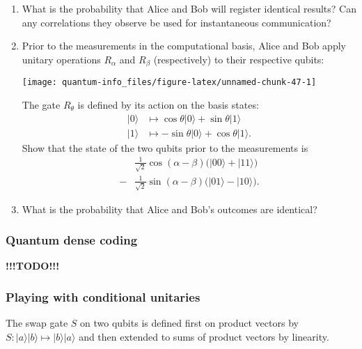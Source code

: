 \documentclass[fleqn]{article}
\begin{document}
\begin{enumerate}
\def\labelenumi{\arabic{enumi}.}
\item
  What is the probability that Alice and Bob will register identical results?
  Can any correlations they observe be used for instantaneous communication?
\item
  Prior to the measurements in the computational basis, Alice and Bob apply unitary operations \(R_\alpha\) and \(R_\beta\) (respectively) to their respective qubits:

  \begin{center}\texttt{[image: quantum-info\_files/figure-latex/unnamed-chunk-47-1]} \end{center}

  The gate \(R_\theta\) is defined by its action on the basis states:
  \[
     \begin{aligned}
       |0\rangle
       &\longmapsto
       \cos\theta|0\rangle + \sin\theta|1\rangle
     \\|1\rangle
       &\longmapsto
       -\sin\theta|0\rangle + \cos\theta|1\rangle.
     \end{aligned}
   \]
  Show that the state of the two qubits prior to the measurements is
  \[
     \begin{aligned}
       &\frac{1}{\sqrt2}\cos(\alpha-\beta)\big( |00\rangle + |11\rangle \big)
     \\- &\frac{1}{\sqrt2}\sin(\alpha-\beta)\big( |01\rangle - |10\rangle \big).
     \end{aligned}
   \]
\item
  What is the probability that Alice and Bob's outcomes are identical?
\end{enumerate}

\hypertarget{quantum-dense-coding}{%
\subsubsection{Quantum dense coding}\label{quantum-dense-coding}}

\textbf{!!!TODO!!!}

\hypertarget{playing-with-conditional-unitaries}{%
\subsubsection{Playing with conditional unitaries}\label{playing-with-conditional-unitaries}}

The swap gate \(S\) on two qubits is defined first on product vectors by \(S\colon|a\rangle|b\rangle\mapsto|b\rangle|a\rangle\) and then extended to sums of product vectors by linearity.
\end{document}
